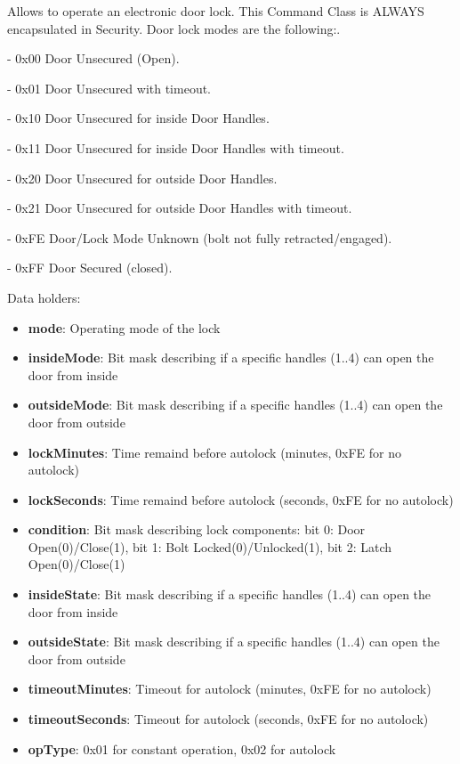 Allows to operate an electronic door lock. This Command Class is ALWAYS encapsulated in Security. Door lock modes are the following:. 

- 0x00 Door Unsecured (Open). 

- 0x01 Door Unsecured with timeout. 

- 0x10 Door Unsecured for inside Door Handles. 

- 0x11 Door Unsecured for inside Door Handles with timeout. 

- 0x20 Door Unsecured for outside Door Handles. 

- 0x21 Door Unsecured for outside Door Handles with timeout. 

- 0xFE Door/Lock Mode Unknown (bolt not fully retracted/engaged). 

- 0xFF Door Secured (closed).
\newline

\noindent
Data holders:

\begin{itemize}
\item \textbf{mode}: Operating mode of the lock
\item \textbf{insideMode}: Bit mask describing if a specific handles (1..4) can open the door from inside
\item \textbf{outsideMode}: Bit mask describing if a specific handles (1..4) can open the door from outside
\item \textbf{lockMinutes}: Time remaind before autolock (minutes, 0xFE for no autolock)
\item \textbf{lockSeconds}: Time remaind before autolock (seconds, 0xFE for no autolock)
\item \textbf{condition}: Bit mask describing lock components: bit 0: Door Open(0)/Close(1), bit 1: Bolt Locked(0)/Unlocked(1), bit 2: Latch Open(0)/Close(1)
\item \textbf{insideState}: Bit mask describing if a specific handles (1..4) can open the door from inside
\item \textbf{outsideState}: Bit mask describing if a specific handles (1..4) can open the door from outside
\item \textbf{timeoutMinutes}: Timeout for autolock (minutes, 0xFE for no autolock)
\item \textbf{timeoutSeconds}: Timeout for autolock (seconds, 0xFE for no autolock)
\item \textbf{opType}: 0x01 for constant operation, 0x02 for autolock
\end{itemize}

